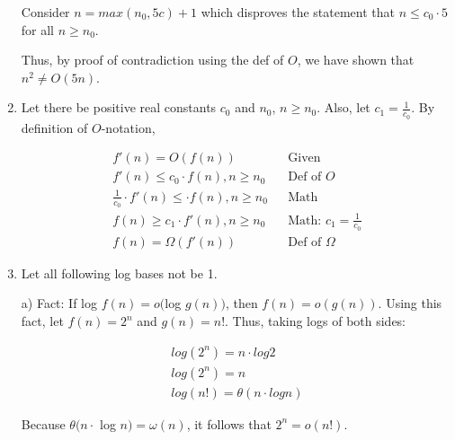 \documentclass[a4paper]{report}
\begin{document}
\begin{enumerate}
    Consider $n = max(n_{0}, 5c) + 1$ which disproves the statement that $n \leq c_{0} \cdot 5$ for all $n \geq n_{0}$.

    Thus, by proof of contradiction using the def of $O$, we have shown that $n^2 \neq O(5n)$.

    \par
    \bigskip
    \setcounter{equation}{0}
    
    \item Let there be positive real constants $c_{0}$ and $n_{0}$, $n \geq n_{0}$. Also, let $c_{1} = \frac{1}{c_{0}}$. By definition of $O$-notation, 

    \begin{align}
      f'(n) = O(f(n))                                   &&\text{Given }\\
      f'(n) \leq c_{0} \cdot f(n), n \geq n_{0}          &&\text{Def of $O$}\\
      \frac{1}{c_{0}} \cdot f'(n) \leq \cdot f(n), n \geq n_{0}          &&\text{Math}\\
      f(n) \geq c_{1} \cdot f'(n), n \geq n_{0}          &&\text{Math: $c_{1} = \frac{1}{c_{0}}$}\\
      f(n)  = \Omega(f'(n))                               &&\text{Def of $\Omega$}
    \end{align}

    
    \pagebreak
    \bigskip
    \setcounter{equation}{0}

    \item 

      Let all following log bases not be 1. 

      a) Fact: If log $f(n) = o($log $g(n))$, then $f(n) = o(g(n))$. 
      Using this fact, let $f(n) = 2^n$ and $g(n) = n!$. Thus, taking logs of both sides:

      \begin{align}
        log(2^n) = n \cdot log 2 \\
        log(2^n) = n \\
        log(n!) = \theta(n \cdot log n) 
      \end{align}

      Because $\theta(n \cdot$ log $n) = \omega(n)$, it follows that $2^n = o(n!)$.


\end{enumerate}
\end{document}
